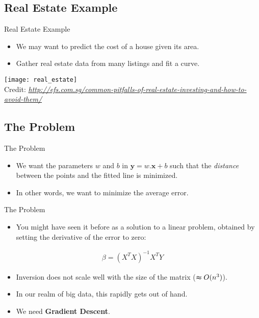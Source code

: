 \documentclass[xcolor=x11names,compress]{beamer}
\renewcommand{\(}{\begin{columns}}
\renewcommand{\)}{\end{columns}}
\newcommand{\<}[1]{\begin{column}{#1}}
\renewcommand{\>}{\end{column}}
\begin{document}
\subsection{Real Estate Example}
\begin{frame}{Real Estate Example}
	\begin{itemize}
		\item We may want to predict the cost of a house given its area.
		\item Gather real estate data from many listings and fit a curve.
	\end{itemize}
	\begin{center}
	   \texttt{[image: real\_estate]}\\[-1ex]
	   {\tiny Credit: {\itshape \url{http://efs.com.sg/common-pitfalls-of-real-estate-investing-and-how-to-avoid-them/}}}
	\end{center}
\end{frame}

\subsection{The Problem}
\begin{frame}{The Problem}
	\begin{itemize}
		\item We want the parameters $w$ and $b$ in $\boldsymbol{y} = w.\boldsymbol{x} + b$ such that the \textit{distance} between the points and the fitted line is minimized.
		\item In other words, we want to minimize the average error.
		\begin{center}
		\end{center}
	\end{itemize}
\end{frame}

\begin{frame}{The Problem}
	\begin{itemize}
		\item You might have seen it before as a solution to a linear problem, obtained by setting the derivative of the error to zero:
	\end{itemize}
	\begin{gather*}
		\beta = (X^TX)^{-1}X^TY
	\end{gather*}
	\begin{itemize}
		\item Inversion does not scale well with the size of the matrix ($\thickapprox O(n^3)$).
		\item In our realm of big data, this rapidly gets out of hand.
		\item We need \textbf{Gradient Descent}.
	\end{itemize}
\end{frame}
\end{document}
